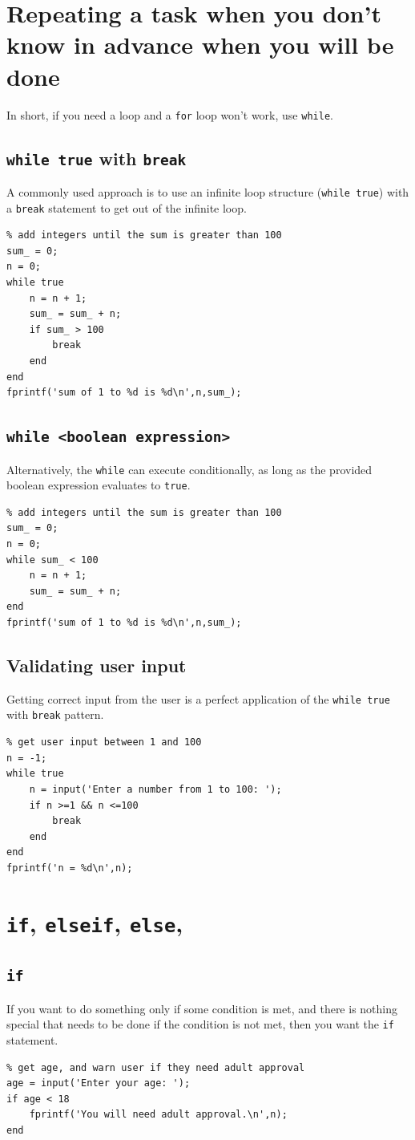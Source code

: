 \documentclass{report}
\newcommand{\code}[1]{\texttt{#1}}
\begin{document}
\section{Repeating a task when you don't know in advance when you will be done}
In short, if you need a loop and a  \code{for} loop won't work, use \code{while}.
\subsection{\code{while true} with \code{break}}
A commonly used approach is to use an infinite loop structure (\code{while true}) with a \code{break} statement to get out of the infinite loop.
\begin{lstlisting}
% add integers until the sum is greater than 100
sum_ = 0;
n = 0;
while true
    n = n + 1;
    sum_ = sum_ + n;
    if sum_ > 100
        break
    end
end
fprintf('sum of 1 to %d is %d\n',n,sum_);
\end{lstlisting}

\subsection{\code{while <boolean expression>}}
Alternatively, the \code{while} can execute conditionally, as long as the provided boolean expression evaluates to \code{true}.
\begin{lstlisting}
% add integers until the sum is greater than 100
sum_ = 0;
n = 0;
while sum_ < 100
    n = n + 1;
    sum_ = sum_ + n;
end
fprintf('sum of 1 to %d is %d\n',n,sum_);
\end{lstlisting}

\pagebreak
\subsection{Validating user input}
Getting correct input from the user is a perfect application of the  \code{while true} with \code{break} pattern.
\begin{lstlisting}
% get user input between 1 and 100
n = -1;
while true
    n = input('Enter a number from 1 to 100: ');
    if n >=1 && n <=100
        break
    end
end
fprintf('n = %d\n',n);
\end{lstlisting}

\section{\code{if}, \code{elseif}, \code{else}, }

\subsection{\code{if}}
If you want to do something only if some condition is met, and there is nothing special that needs to be done if the condition is not met, then you want the \code{if} statement. 
\begin{lstlisting}
% get age, and warn user if they need adult approval
age = input('Enter your age: ');
if age < 18
    fprintf('You will need adult approval.\n',n);
end
\end{lstlisting}
\end{document}
